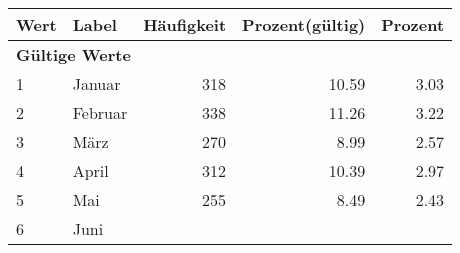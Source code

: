      \begin{longtable}{lXrrr}
     \toprule
     \textbf{Wert} & \textbf{Label} & \textbf{Häufigkeit} & \textbf{Prozent(gültig)} & \textbf{Prozent} \\
     \endhead
     \midrule
     \multicolumn{5}{l}{\textbf{Gültige Werte}}\\

     1 &
     \multicolumn{1}{X}{ Januar   } &


       \num{318} &
       \num[round-mode=places,round-precision=2]{10,59} &
         \num[round-mode=places,round-precision=2]{3,03} \\

     2 &
     \multicolumn{1}{X}{ Februar   } &


       \num{338} &
       \num[round-mode=places,round-precision=2]{11,26} &
         \num[round-mode=places,round-precision=2]{3,22} \\

     3 &
     \multicolumn{1}{X}{ März   } &


       \num{270} &
       \num[round-mode=places,round-precision=2]{8,99} &
         \num[round-mode=places,round-precision=2]{2,57} \\

     4 &
     \multicolumn{1}{X}{ April   } &


       \num{312} &
       \num[round-mode=places,round-precision=2]{10,39} &
         \num[round-mode=places,round-precision=2]{2,97} \\

     5 &
     \multicolumn{1}{X}{ Mai   } &


       \num{255} &
       \num[round-mode=places,round-precision=2]{8,49} &
         \num[round-mode=places,round-precision=2]{2,43} \\

     6 &
     \multicolumn{1}{X}{ Juni   } &



\end{longtable}
